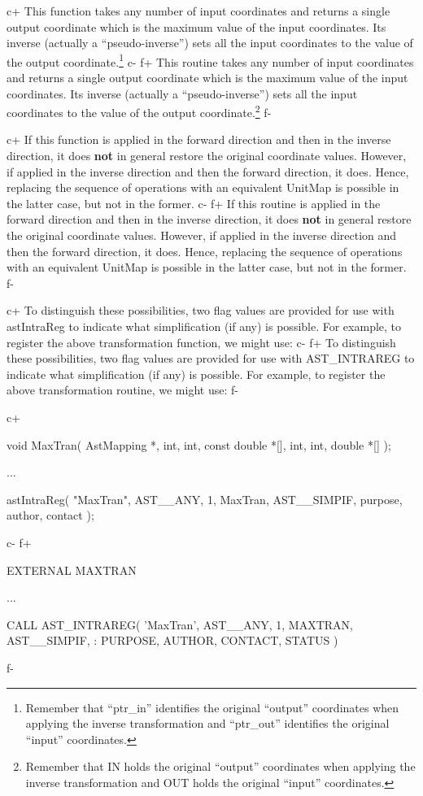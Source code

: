 \documentclass[twoside,11pt]{starlink}
\begin{document}
c+
This function takes any number of input coordinates and returns a
single output coordinate which is the maximum value of the input
coordinates. Its inverse (actually a ``pseudo-inverse'') sets all the
input coordinates to the value of the output
coordinate.\footnote{Remember that ``ptr\_in'' identifies the original
``output'' coordinates when applying the inverse transformation and
``ptr\_out'' identifies the original ``input'' coordinates.}
c-
f+
This routine takes any number of input coordinates and returns a
single output coordinate which is the maximum value of the input
coordinates. Its inverse (actually a ``pseudo-inverse'') sets all the
input coordinates to the value of the output
coordinate.\footnote{Remember that IN holds the original ``output''
coordinates when applying the inverse transformation and OUT holds the
original ``input'' coordinates.}
f-

c+
If this function is applied in the forward direction and then in the
inverse direction, it does \textbf{not} in general restore the original
coordinate values. However, if applied in the inverse direction and
then the forward direction, it does. Hence, replacing the sequence of
operations with an equivalent UnitMap is possible in the latter case,
but not in the former.
c-
f+
If this routine is applied in the forward direction and then in the
inverse direction, it does \textbf{not} in general restore the original
coordinate values. However, if applied in the inverse direction and
then the forward direction, it does. Hence, replacing the sequence of
operations with an equivalent UnitMap is possible in the latter case,
but not in the former.
f-

c+
To distinguish these possibilities, two flag values are provided for
use with astIntraReg to indicate what simplification (if any) is
possible. For example, to register the above transformation function,
we might use:
c-
f+
To distinguish these possibilities, two flag values are provided for
use with AST\_INTRAREG to indicate what simplification (if any) is
possible. For example, to register the above transformation routine,
we might use:
f-

c+
\small
\begin{terminalv}
void MaxTran( AstMapping *, int, int, const double *[], int, int, double *[] );

...

astIntraReg( "MaxTran", AST__ANY, 1, MaxTran, AST__SIMPIF,
             purpose, author, contact );
\end{terminalv}
\normalsize
c-
f+
\small
\begin{terminalv}
      EXTERNAL MAXTRAN

      ...

      CALL AST_INTRAREG( 'MaxTran', AST__ANY, 1, MAXTRAN, AST__SIMPIF,
     :                   PURPOSE, AUTHOR, CONTACT, STATUS )
\end{terminalv}
\normalsize
f-
\end{document}
